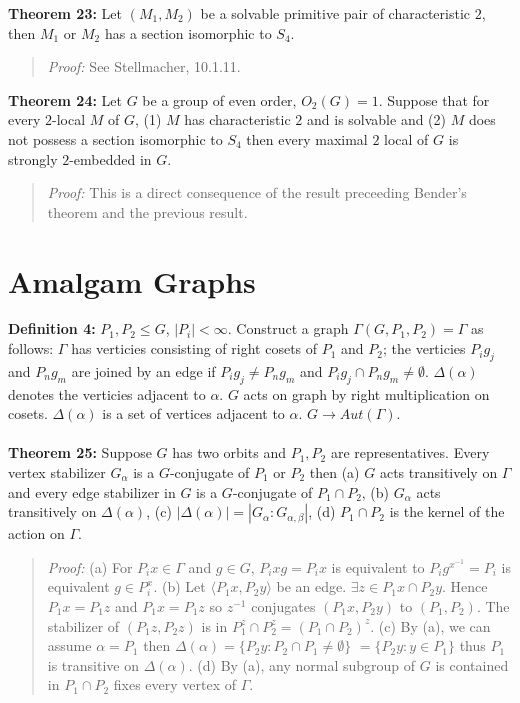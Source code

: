 {\bf Theorem 23:}
Let $(M_1, M_2)$ be a solvable primitive pair of characteristic $2$, then $M_1$ or
$M_2$ has a section isomorphic to $S_4$.
\begin{quote}
\emph{Proof:}  
See Stellmacher, 10.1.11.
\end{quote}
{\bf Theorem 24:}
Let $G$ be a group of even order, $O_2(G)=1$.  Suppose that for every $2$-local $M$ of $G$,
(1) $M$ has characteristic $2$ and is solvable and (2) $M$ does not possess a section
isomorphic to $S_4$ then every maximal $2$ local of $G$ is strongly $2$-embedded in $G$.
\begin{quote}
\emph{Proof:}  
This is a direct consequence of the result preceeding Bender's theorem and the previous result.
\end{quote}
\section {Amalgam Graphs}
{\bf Definition 4:}
$P_1, P_2 \le G$, $|P_i|< \infty$.  Construct a graph $\Gamma(G, P_1, P_2)=\Gamma$
as follows: 
$\Gamma$ has verticies consisting of right cosets of $P_1$ and $P_2$; the verticies
$P_i g_j$ and $P_n g_m$ are
joined by an edge if 
$P_i g_j \ne P_n g_m$ and
$P_i g_j \cap P_n g_m \ne \emptyset$.  $\Delta(\alpha)$ denotes the verticies
adjacent to $\alpha$.  $G$ acts on graph by right multiplication on cosets.  
$\Delta(\alpha)$ is a set of vertices adjacent to $\alpha$.
$G \rightarrow Aut(\Gamma)$.
\\
\\
{\bf Theorem 25:}
Suppose $G$ has two orbits and $P_1, P_2$ are representatives.  Every vertex stabilizer
$G_{\alpha}$ is a $G$-conjugate of $P_1$ or $P_2$ then
(a) $G$ acts transitively on $\Gamma$ and every edge stabilizer in
$G$ is a $G$-conjugate of $P_1 \cap P_2$, (b) $G_{\alpha}$ acts transitively
on $\Delta(\alpha)$, (c) $|\Delta(\alpha)|= |G_{\alpha}:G_{\alpha, \beta}|$,
(d) $P_1 \cap P_2$ is the kernel of the action on $\Gamma$.
\begin{quote}
\emph{Proof:}  
(a) For $P_ix \in \Gamma$ and $g \in G$, $P_ixg=P_ix$ is equivalent to
$P_i g^{x^{-1}} = P_i$ is equivalent $g \in P_i^x$.
(b) Let $\langle P_1x, P_2y \rangle$ be an edge.  $\exists z \in P_1x \cap P_2y$.  Hence
$P_1x = P_1z$ and $P_1x = P_1z$ so $z^{-1}$ conjugates $(P_1x, P_2y)$ to $(P_1, P_2)$.  The
stabilizer of $(P_1z, P_2z)$ is in $P_1^z \cap P_2^z= (P_1 \cap P_2)^z$.
(c) By (a), we can assume $\alpha= P_1$ then $\Delta( \alpha ) = \{ P_2y : P_2 \cap P_1 \neq \emptyset \}$
$= \{ P_2y : y \in P_1 \}$ thus $P_1$ is transitive on $\Delta( \alpha )$.
(d) By (a), any normal subgroup of $G$ is contained in $P_1 \cap P_2$ fixes every vertex of $\Gamma$.
\end{quote}
